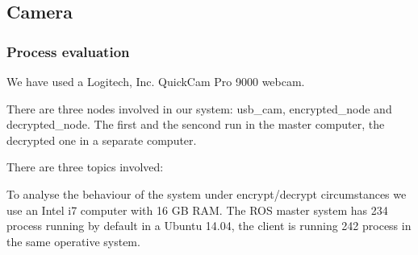 \documentclass[journal,twoside]{JoPhA}
\begin{document}
% 
% 





\subsection{Camera}

\subsubsection{Process evaluation}

We have used a Logitech, Inc. QuickCam Pro 9000 webcam.

There are three nodes involved in our system: usb\_cam, encrypted\_node and decrypted\_node. The first and the sencond run in the master computer, the decrypted one in a separate computer.

There are three topics involved: 

To analyse the behaviour of the system under encrypt/decrypt circumstances we use an Intel i7 computer with 16 GB RAM. The ROS master system has 234 process running by default in a Ubuntu 14.04, the client is running 242 process in the same operative system.
\end{document}
